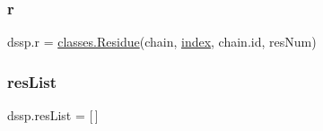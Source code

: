 \subsubsection{\texorpdfstring{r}{r}}
{\footnotesize\ttfamily dssp.\+r = \hyperlink{classclasses_1_1Residue}{classes.\+Residue}(chain, \hyperlink{namespacedssp_a2570d614feb77a7f9dda56d1e990a944}{index}, chain.\+id, res\+Num)}

\mbox{\label{namespacedssp_a0437a710ae9bafa770b3c8cf7ff1ac9c}} 
\subsubsection{\texorpdfstring{res\+List}{resList}}
{\footnotesize\ttfamily dssp.\+res\+List = \mbox{[}$\,$\mbox{]}}

